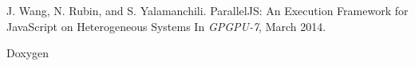 
J. Wang, N. Rubin, and S. Yalamanchili. \newblock ParallelJS: An Execution Framework for JavaScript on Heterogeneous Systems
\newblock In \emph{GPGPU-7}, March 2014.

Doxygen

